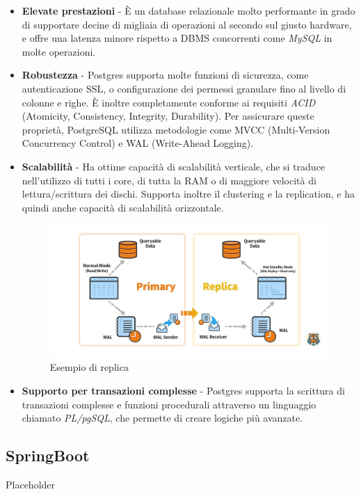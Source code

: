 \begin{itemize}
  \item \textbf{Elevate prestazioni} - \`E un database relazionale molto performante in grado di supportare decine di migliaia di operazioni al secondo sul giusto hardware,
    e offre una latenza minore rispetto a DBMS concorrenti come \textit{MySQL} in molte operazioni.\cite{salunke2024performance}
  \item \textbf{Robustezza} - Postgres supporta molte funzioni di sicurezza, come autenticazione SSL, o configurazione dei permessi granulare fino al
    livello di colonne e righe.
    \`E inoltre completamente conforme ai requisiti \textit{ACID} (Atomicity, Consistency, Integrity, Durability).
    Per assicurare queste propriet\`a, PostgreSQL utilizza metodologie come MVCC (Multi-Version Concurrency Control) e WAL (Write-Ahead Logging).
  \item \textbf{Scalabilit\`a} - Ha ottime capacit\`a di scalabilit\`a verticale, che si traduce nell'utilizzo di tutti i core,
    di tutta la RAM o di maggiore velocit\`a di lettura/scrittura dei dischi.
    Supporta inoltre il clustering e la replication, e ha quindi anche capacit\`a di scalabilit\`a orizzontale.
    \begin{figure}[H]
      \centering
      \includegraphics[width=15cm]{images/postgres-replication.png}
      \caption{Esempio di replica\cite{postgreshighavail}}
    \end{figure}
  \item \textbf{Supporto per transazioni complesse} - Postgres supporta la scrittura di transazioni complesse e funzioni procedurali attraverso un linguaggio chiamato
    \textit{PL/pgSQL}, che permette di creare logiche pi\`u avanzate.
\end{itemize}
\subsection {SpringBoot}
Placeholder
